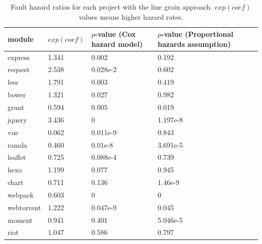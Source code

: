 \begin{table}[t]
	\centering
	\scriptsize
	\caption{Fault hazard ratios for each project with the line grain approach. $exp(coef)$ values means higher hazard rates.}
	\label{hazardlinegrain}
	\begin{tabular}{l|l|l|m{4cm}}
		\hline
		module & $exp(coef)$ & $p$-value (Cox hazard model) & $p$-value (Proportional hazards assumption)     \\ \hline
		express  & 1.341 & 0.002 & 0.192 \\ \hline
		request  & 2.538 & 0.028e-2 & 0.602 \\ \hline
		less  & 1.791 & 0.003 & 0.419 \\ \hline
		bower	 & 1.321 & 0.027 & 0.982 \\ \hline
		grunt    & 0.594 & 0.005 & 0.019 \\ \hline
		jquery	 & 3.436 & 0 & 1.197e-8 \\ \hline
		vue   & 0.062 & 0.011e-9 & 0.843 \\ \hline
		ramda 	 & 0.460 & 0.01e-8 & 3.691e-5 \\ \hline
		leaflet	 & 0.725 & 0.088e-4 & 0.739 \\ \hline
		hexo	 & 1.199 & 0.077 & 0.945 \\ \hline
		chart	 & 0.711 & 0.136 & 1.46e-9 \\ \hline
		webpack	 & 0.603 & 0 & 0 \\ \hline
		webtorrent & 1.222 & 0.047e-9 & 0.045 \\ \hline
		moment	 & 0.941 & 0.401 & 5.046e-5 \\ \hline
		riot	 & 1.047 & 0.586 & 0.797 \\ \hline
	\end{tabular}

\end{table}


